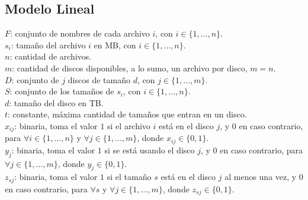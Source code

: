 \subsection{Modelo Lineal}
$F$: conjunto de nombres de cada archivo $i$, con $i \in \{1, \ldots, n\}$. \\
$s_{i}$: tamaño del archivo $i$ en MB, con $i \in \{1, \ldots, n\}$. \\
$n$: cantidad de archivos. \\
$m$: cantidad de discos disponibles, a lo sumo, un archivo por disco, $m = n$. \\
$D$: conjunto de $j$ discos de tamaño $d$, con $j \in \{1, \ldots, m\}$. \\
$S$: conjunto de los tamaños de $s_{i}$, con $i \in \{1, \ldots, n\}$. \\ 
$d$: tamaño del disco en TB. \\ 
$t$: constante, máxima cantidad de tamaños que entran en un disco. \\ 
$x_{ij}$: binaria, toma el valor $1$ si el archivo $i$ está en el disco $j$, y $0$ en caso contrario, para $\forall i \in \{1, \ldots, n\}$ y $\forall j \in \{1, \ldots, m\}$, donde $x_{ij} \in \{0, 1\}$. \\
$y_{j}$: binaria, toma el valor $1$ si se está usando el disco $j$, y $0$ en caso contrario, para $\forall j \in \{1, \ldots, m\}$, donde $y_{j} \in \{0, 1\}$. \\
$z_{sj}$: binaria, toma el valor $1$ si el tamaño $s$ está en el disco $j$ al menos una vez, y $0$ en caso contrario, para $\forall s$ y $\forall j \in \{1, \ldots, m\}$, donde $z_{sj} \in \{0, 1\}$. \\

